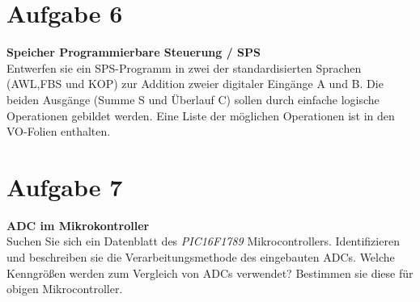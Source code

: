 \documentclass[12pt,a4paper,ngerman]{article}
\begin{document}
\pagebreak

\section{Aufgabe 6}
\begin{framed}
\textbf{Speicher Programmierbare Steuerung / SPS} \\
Entwerfen sie ein SPS-Programm in zwei der standardisierten Sprachen (AWL,FBS und KOP) zur Addition zweier digitaler Eingänge A und B. Die beiden Ausgänge (Summe S und Überlauf C) sollen durch einfache logische Operationen gebildet werden. Eine Liste der möglichen Operationen ist in den VO-Folien enthalten.
\end{framed}
   
\pagebreak

\section{Aufgabe 7}

\begin{framed}
\textbf{ADC im Mikrokontroller} \\
Suchen Sie sich ein Datenblatt des \textit{PIC16F1789} Mikrocontrollers. Identifizieren und beschreiben sie die Verarbeitungsmethode des eingebauten ADCs. Welche Kenngrößen werden zum Vergleich von ADCs verwendet? Bestimmen sie diese für obigen Mikrocontroller. 
\end{framed}   
   
   
   
\end{document}
